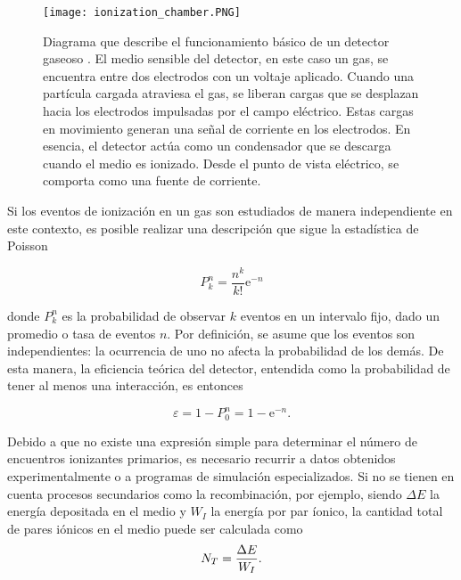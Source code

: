 \documentclass{article}
\begin{document}
\begin{figure}[H]
    \centering
    \texttt{[image: ionization\_chamber.PNG]}
    \caption{Diagrama que describe el funcionamiento básico de un detector gaseoso \cite{kolanoski2020particle2}. El medio sensible del detector, en este caso un gas, se encuentra entre dos electrodos con un voltaje aplicado. Cuando una partícula cargada atraviesa el gas, se liberan cargas que se desplazan hacia los electrodos impulsadas por el campo eléctrico. Estas cargas en movimiento generan una señal de corriente en los electrodos. En esencia, el detector actúa como un condensador que se descarga cuando el medio es ionizado. Desde el punto de vista eléctrico, se comporta como una fuente de corriente.}
    \label{fig:ionization_chamber1}
\end{figure}

\noindent Si los eventos de ionización en un gas son estudiados de manera independiente en este contexto, es posible realizar una descripción que sigue la estadística de Poisson

\begin{equation}
    \label{eq:poisson}
    P_k^n=\frac{n^k}{k!} \mathrm{e}^{-n}
\end{equation}

\noindent donde $ P_k^n$ es la probabilidad de observar $k$ eventos en un intervalo fijo, dado un promedio o tasa de eventos $n$. Por definición, se asume que los eventos son independientes: la ocurrencia de uno no afecta la probabilidad de los demás. De esta manera, la eficiencia teórica del detector, entendida como la probabilidad de tener al menos una interacción, es entonces

\begin{equation}
    \label{eq:det_eff}
    \varepsilon=1-P_0^n=1-\mathrm{e}^{-n} .
\end{equation}

\noindent Debido a que no existe una expresión simple para determinar el número de encuentros ionizantes primarios, es necesario recurrir a datos obtenidos experimentalmente o a programas de simulación especializados. Si no se tienen en cuenta procesos secundarios como la recombinación, por ejemplo, siendo $\Delta E$ la energía depositada en el medio y $W_{I}$ la energía por par íonico, la cantidad total de pares iónicos en el medio puede ser calculada como 
\begin{equation}
    \label{eq:num_ion}
    N_{T} = \frac{\Delta E}{W_{I}}. \\
\end{equation}
\end{document}
